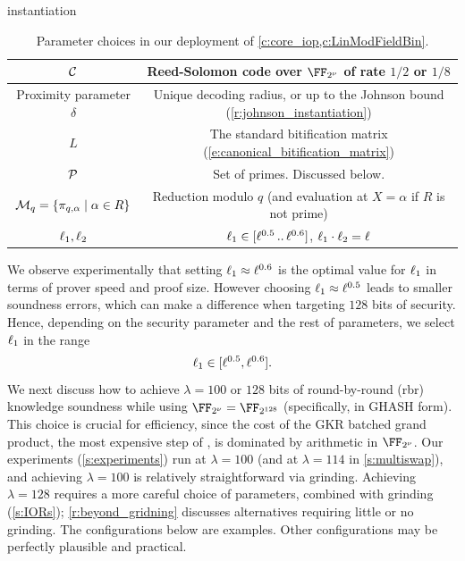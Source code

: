 \begin{lncsappendix}{instantiation}
\begin{table}[H]
\begin{tabular}{c|c}
        \hline
        $\mathcal{C}$ & Reed-Solomon code over $\comfield$ of rate $1/2$ or $1/8$\\
        \hline
        Proximity parameter $\delta$ & Unique decoding radius, or up to the Johnson bound (\cref{r:johnson_instantiation})\\
        \hline
        $L$ & The standard bitification matrix (\cref{e:canonical_bitification_matrix})\\ 
         \hline
        $\mathcal{P}$ & Set of primes. Discussed below.\\
         \hline
        $\mathcal{M}_q=\{\pi_{q,\alpha}\mid \alpha\in R\}$ & Reduction modulo $q$ (and evaluation at $X=\alpha$ if $R$ is not prime)\\
        \hline $\ell_1,\ell_2$ & $\ell_1\in [\ell^{0.5} \, .. \, \ell^{0.6}]$, $\ell_1\cdot\ell_2=\ell$
    \end{tabular}
    \caption{Parameter choices in our deployment of \cref{c:core_iop,c:LinModFieldBin}.}
    \label{tab:instantiation_params}
\end{table}





%
We observe experimentally that setting $\ell_1 \approx \ell^{0.6}$  is the optimal value for $\ell_1$ in terms of prover speed and proof size. However choosing $\ell_1\approx \ell^{0.5}$ leads to smaller soundness errors, which can make a difference when  targeting $128$ bits of security.  Hence, depending on the security parameter and the rest of parameters, we select $\ell_1$ in the range
%
\begin{equation}\label{e:codedim_1_proportion}
\ell_1 \in [\ell^{0.5}, \ell^{0.6}].
\end{equation}
%
We next discuss how to achieve $\lambda=100$ or $128$ bits of round-by-round (rbr) knowledge soundness while using $\comfield=\FF_{2^{128}}$ (specifically, in GHASH form). This choice is crucial for efficiency, since the cost of the GKR batched grand product, the most expensive step of \ftwoz, is dominated by arithmetic in $\comfield$. Our experiments (\cref{s:experiments}) run at $\lambda=100$ (and at $\lambda=114$ in \cref{s:multiswap}), and achieving $\lambda=100$ is relatively straightforward via grinding. Achieving $\lambda=128$ requires a more careful choice of parameters, combined with grinding (\cref{s:IORs}); \cref{r:beyond_gridning} discusses alternatives requiring little or no grinding. The configurations below are examples. Other configurations may be perfectly plausible and practical. 
\bigskip



\end{lncsappendix}

